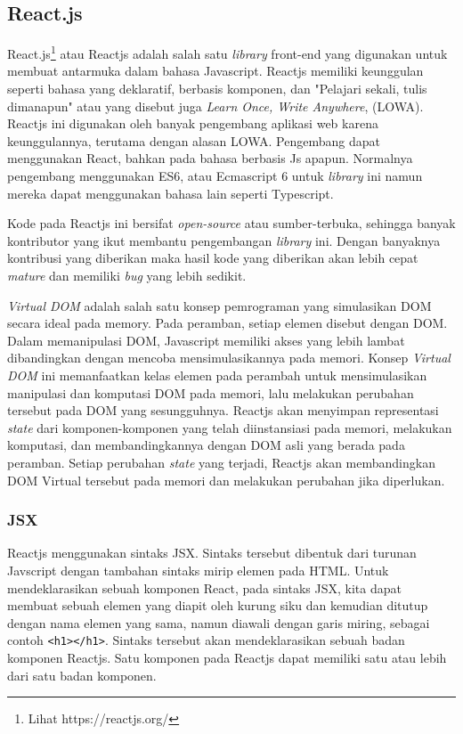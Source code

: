 \subsection{React.js}
    React.js\footnote{Lihat https://reactjs.org/} atau Reactjs adalah salah satu
    \textit{library} front-end yang digunakan untuk membuat antarmuka
    \cite{facebook:react-homepage} dalam bahasa Javascript. Reactjs memiliki keunggulan
    seperti bahasa yang deklaratif, berbasis komponen, dan "Pelajari sekali,
    tulis dimanapun" atau yang disebut juga \textit{Learn Once, Write Anywhere},
    (LOWA)\cite{facebook:react-homepage}. Reactjs ini digunakan oleh banyak
    pengembang aplikasi web karena keunggulannya, terutama dengan alasan LOWA.
    Pengembang dapat menggunakan React, bahkan pada bahasa berbasis Js apapun.
    Normalnya pengembang menggunakan ES6, atau Ecmascript 6 untuk
    \textit{library} ini namun mereka dapat menggunakan bahasa lain seperti
    Typescript\cite{typescript:react-ts}.
        
    Kode pada Reactjs ini bersifat \textit{open-source} atau sumber-terbuka,
    sehingga banyak kontributor yang ikut membantu pengembangan \textit{library}
    ini. Dengan banyaknya kontribusi yang diberikan maka hasil kode yang
    diberikan akan lebih cepat \textit{mature} dan memiliki \textit{bug} yang
    lebih sedikit.

    \textit{Virtual DOM} adalah salah satu konsep pemrograman yang simulasikan
    DOM secara ideal pada memory\cite{facebook:react-faq}. Pada peramban, setiap
    elemen disebut dengan DOM. Dalam memanipulasi DOM, Javascript memiliki akses
    yang lebih lambat dibandingkan dengan mencoba mensimulasikannya pada memori.
    Konsep \textit{Virtual DOM} ini memanfaatkan kelas elemen pada perambah untuk
    mensimulasikan manipulasi dan komputasi DOM pada memori, lalu melakukan perubahan
    tersebut pada DOM yang sesungguhnya.
    Reactjs akan menyimpan representasi \textit{state} dari komponen-komponen yang telah
    diinstansiasi pada memori, melakukan komputasi, dan membandingkannya dengan 
    DOM asli yang berada pada
    peramban. Setiap perubahan \textit{state} yang terjadi, Reactjs akan
    membandingkan DOM Virtual tersebut pada memori dan melakukan perubahan jika
    diperlukan.
    
    \subsubsection{JSX}
    Reactjs menggunakan sintaks JSX. Sintaks tersebut dibentuk dari turunan Javscript 
    dengan tambahan sintaks mirip elemen pada HTML. Untuk mendeklarasikan sebuah 
    komponen React, pada sintaks JSX, kita dapat membuat sebuah elemen yang diapit
    oleh kurung siku dan kemudian ditutup dengan nama elemen yang sama, namun diawali
    dengan garis miring, sebagai contoh \texttt{<h1></h1>}.
    Sintaks tersebut akan mendeklarasikan sebuah badan komponen Reactjs.
    Satu komponen pada Reactjs dapat memiliki satu atau lebih dari satu badan komponen.
    
